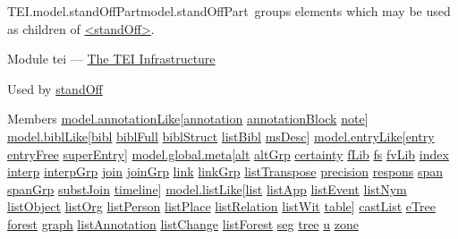\begin{reflist}
\item[]\begin{specHead}{TEI.model.standOffPart}{model.standOffPart} groups elements which may be used as children of \hyperref[TEI.standOff]{<standOff>}.\end{specHead} 
    \item[{Module}]
  tei — \hyperref[ST]{The TEI Infrastructure}
    \item[{Used by}]
  \hyperref[TEI.standOff]{standOff}
    \item[{Members}]
  \hyperref[TEI.model.annotationLike]{model.annotationLike}[\hyperref[TEI.annotation]{annotation} \hyperref[TEI.annotationBlock]{annotationBlock} \hyperref[TEI.note]{note}] \hyperref[TEI.model.biblLike]{model.biblLike}[\hyperref[TEI.bibl]{bibl} \hyperref[TEI.biblFull]{biblFull} \hyperref[TEI.biblStruct]{biblStruct} \hyperref[TEI.listBibl]{listBibl} \hyperref[TEI.msDesc]{msDesc}] \hyperref[TEI.model.entryLike]{model.entryLike}[\hyperref[TEI.entry]{entry} \hyperref[TEI.entryFree]{entryFree} \hyperref[TEI.superEntry]{superEntry}] \hyperref[TEI.model.global.meta]{model.global.meta}[\hyperref[TEI.alt]{alt} \hyperref[TEI.altGrp]{altGrp} \hyperref[TEI.certainty]{certainty} \hyperref[TEI.fLib]{fLib} \hyperref[TEI.fs]{fs} \hyperref[TEI.fvLib]{fvLib} \hyperref[TEI.index]{index} \hyperref[TEI.interp]{interp} \hyperref[TEI.interpGrp]{interpGrp} \hyperref[TEI.join]{join} \hyperref[TEI.joinGrp]{joinGrp} \hyperref[TEI.link]{link} \hyperref[TEI.linkGrp]{linkGrp} \hyperref[TEI.listTranspose]{listTranspose} \hyperref[TEI.precision]{precision} \hyperref[TEI.respons]{respons} \hyperref[TEI.span]{span} \hyperref[TEI.spanGrp]{spanGrp} \hyperref[TEI.substJoin]{substJoin} \hyperref[TEI.timeline]{timeline}] \hyperref[TEI.model.listLike]{model.listLike}[\hyperref[TEI.list]{list} \hyperref[TEI.listApp]{listApp} \hyperref[TEI.listEvent]{listEvent} \hyperref[TEI.listNym]{listNym} \hyperref[TEI.listObject]{listObject} \hyperref[TEI.listOrg]{listOrg} \hyperref[TEI.listPerson]{listPerson} \hyperref[TEI.listPlace]{listPlace} \hyperref[TEI.listRelation]{listRelation} \hyperref[TEI.listWit]{listWit} \hyperref[TEI.table]{table}] \hyperref[TEI.castList]{castList} \hyperref[TEI.eTree]{eTree} \hyperref[TEI.forest]{forest} \hyperref[TEI.graph]{graph} \hyperref[TEI.listAnnotation]{listAnnotation} \hyperref[TEI.listChange]{listChange} \hyperref[TEI.listForest]{listForest} \hyperref[TEI.seg]{seg} \hyperref[TEI.tree]{tree} \hyperref[TEI.u]{u} \hyperref[TEI.zone]{zone}
\end{reflist}  
